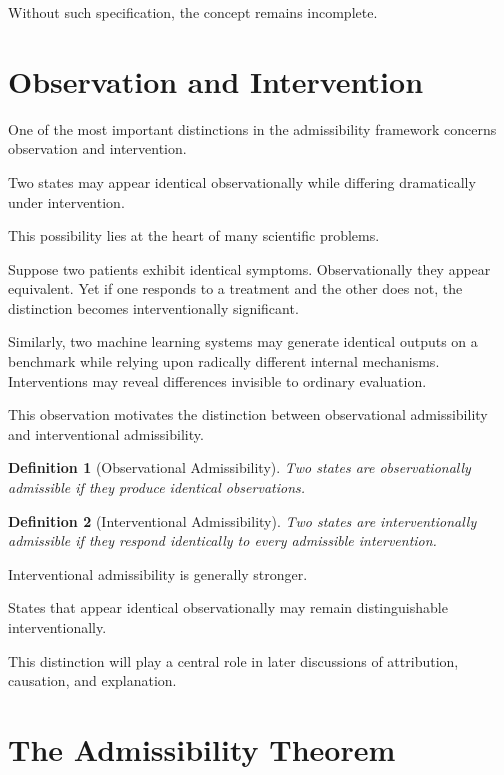 \documentclass[11pt,oneside,openany]{book}
\newtheorem{definition}{Definition}[chapter] \newtheorem{theorem}{Theorem}[chapter] \newtheorem{proposition}{Proposition}[chapter] \newtheorem{lemma}{Lemma}[chapter] \newtheorem{corollary}{Corollary}[chapter] \newtheorem{remark}{Remark}[chapter]
\begin{document}
Without such specification, the concept remains incomplete.

\section{Observation and Intervention}

One of the most important distinctions in the admissibility framework concerns observation and intervention.

Two states may appear identical observationally while differing dramatically under intervention.

This possibility lies at the heart of many scientific problems.

Suppose two patients exhibit identical symptoms. Observationally they appear equivalent. Yet if one responds to a treatment and the other does not, the distinction becomes interventionally significant.

Similarly, two machine learning systems may generate identical outputs on a benchmark while relying upon radically different internal mechanisms. Interventions may reveal differences invisible to ordinary evaluation.

This observation motivates the distinction between observational admissibility and interventional admissibility.

\begin{definition}[Observational Admissibility]

Two states are observationally admissible if they produce identical observations.

\end{definition}

\begin{definition}[Interventional Admissibility]

Two states are interventionally admissible if they respond identically to every admissible intervention.

\end{definition}

Interventional admissibility is generally stronger.

States that appear identical observationally may remain distinguishable interventionally.

This distinction will play a central role in later discussions of attribution, causation, and explanation.

\section{The Admissibility Theorem}
\end{document}
